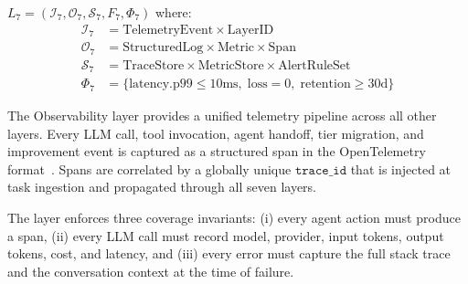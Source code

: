 \begin{definition}
    $L_7 = \left(\mathcal{I}_7, \mathcal{O}_7, \mathcal{S}_7, F_7, \Phi_7\right)$ where:
    \begin{align*}
        \mathcal{I}_7 &= \text{TelemetryEvent} \times \text{LayerID} \\
        \mathcal{O}_7 &= \text{StructuredLog} \times \text{Metric} \times \text{Span} \\
        \mathcal{S}_7 &= \text{TraceStore} \times \text{MetricStore} \times
                         \text{AlertRuleSet} \\
        \Phi_7 &= \{\text{latency.p99} \leq 10\text{ms},\;
                    \text{loss} = 0,\; \text{retention} \geq 30\text{d}\}
    \end{align*}
\end{definition}

The Observability layer provides a unified telemetry pipeline across all
other layers. Every LLM call, tool invocation, agent handoff, tier migration,
and improvement event is captured as a structured span in the OpenTelemetry
format~\cite{opentelemetry2023}. Spans are correlated by a globally unique
$\texttt{trace\_id}$ that is injected at task ingestion and propagated through
all seven layers.

The layer enforces three coverage invariants: (i) every agent action must
produce a span, (ii) every LLM call must record model, provider, input tokens,
output tokens, cost, and latency, and (iii) every error must capture the full
stack trace and the conversation context at the time of failure.

